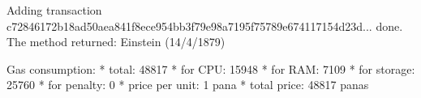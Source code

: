 \begin{shellbox}\begin{ttlst}
Adding transaction c72846172b18ad50aea841f8ece954bb3f79e98a7195f75789e674117154d23d... done.
The method returned:
Einstein (14/4/1879)

Gas consumption:
 * total: 48817
   * for CPU: 15948
   * for RAM: 7109
   * for storage: 25760
   * for penalty: 0
 * price per unit: 1 pana
 * total price: 48817 panas
\end{ttlst}\end{shellbox}
